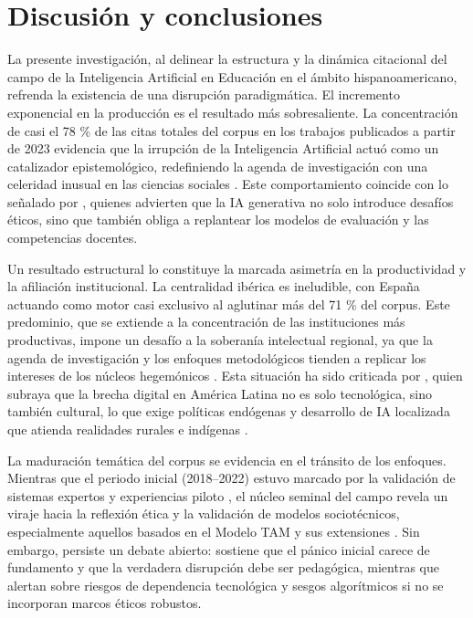 \documentclass[spanish]{textolivre}
\begin{document}

\section{Discusión y conclusiones}
La presente investigación, al delinear la estructura y la dinámica citacional del campo de la Inteligencia Artificial en Educación en el ámbito hispanoamericano, refrenda la existencia de una disrupción paradigmática. El incremento exponencial en la producción es el resultado más sobresaliente. La concentración de casi el 78 \% de las citas totales del corpus en los trabajos publicados a partir de 2023 evidencia que la irrupción de la Inteligencia Artificial actuó como un catalizador epistemológico, redefiniendo la agenda de investigación con una celeridad inusual en las ciencias sociales \cite{michelvillarreal2023, garciapenalvo2023}. Este comportamiento coincide con lo señalado por \textcite{yusuf2024}, quienes advierten que la IA generativa no solo introduce desafíos éticos, sino que también obliga a replantear los modelos de evaluación y las competencias docentes.

Un resultado estructural lo constituye la marcada asimetría en la productividad y la afiliación institucional. La centralidad ibérica es ineludible, con España actuando como motor casi exclusivo al aglutinar más del 71 \% del corpus. Este predominio, que se extiende a la concentración de las instituciones más productivas, impone un desafío a la soberanía intelectual regional, ya que la agenda de investigación y los enfoques metodológicos tienden a replicar los intereses de los núcleos hegemónicos \cite{hinojolucena2019}. Esta situación ha sido criticada por \textcite{catalanpesce2024}, quien subraya que la brecha digital en América Latina no es solo tecnológica, sino también cultural, lo que exige políticas endógenas y desarrollo de IA localizada que atienda realidades rurales e indígenas \cite{monterogutenberg2021}.

La maduración temática del corpus se evidencia en el tránsito de los enfoques. Mientras que el periodo inicial (2018–2022) estuvo marcado por la validación de sistemas expertos y experiencias piloto \cite{vazquezcano2021}, el núcleo seminal del campo revela un viraje hacia la reflexión ética y la validación de modelos sociotécnicos, especialmente aquellos basados en el Modelo TAM y sus extensiones \cite{chocarro2023, raffaghelli2022}. Sin embargo, persiste un debate abierto: \textcite{garciapenalvo2023} sostiene que el pánico inicial carece de fundamento y que la verdadera disrupción debe ser pedagógica, mientras que \textcite{prendesespinosa2021} alertan sobre riesgos de dependencia tecnológica y sesgos algorítmicos si no se incorporan marcos éticos robustos.
\end{document}

